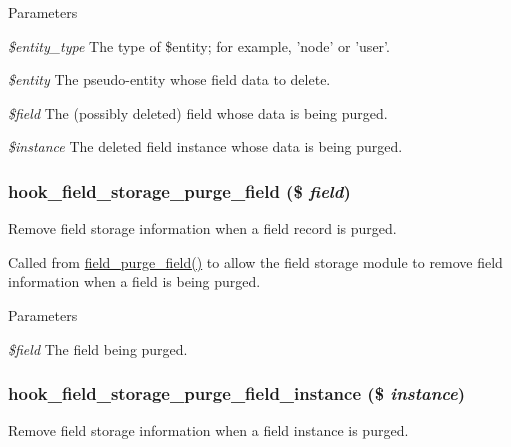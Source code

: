 \begin{DoxyParams}{Parameters}
\item[{\em \$entity\_\-type}]The type of \$entity; for example, 'node' or 'user'. \item[{\em \$entity}]The pseudo-\/entity whose field data to delete. \item[{\em \$field}]The (possibly deleted) field whose data is being purged. \item[{\em \$instance}]The deleted field instance whose data is being purged. \end{DoxyParams}
\hypertarget{group__field__crud_gaf58b7071fdeee08fb4edadc127eecd5d}{
\subsubsection[{hook\_\-field\_\-storage\_\-purge\_\-field}]{\setlength{\rightskip}{0pt plus 5cm}hook\_\-field\_\-storage\_\-purge\_\-field (\$ {\em field})}}
\label{group__field__crud_gaf58b7071fdeee08fb4edadc127eecd5d}
Remove field storage information when a field record is purged.

Called from \hyperlink{group__field__purge_gac52122a65da997921f3a6a8f45deddbf}{field\_\-purge\_\-field()} to allow the field storage module to remove field information when a field is being purged.


\begin{DoxyParams}{Parameters}
\item[{\em \$field}]The field being purged. \end{DoxyParams}
\hypertarget{group__field__crud_ga9634594ee1edc36db59d2e87abfaf193}{
\subsubsection[{hook\_\-field\_\-storage\_\-purge\_\-field\_\-instance}]{\setlength{\rightskip}{0pt plus 5cm}hook\_\-field\_\-storage\_\-purge\_\-field\_\-instance (\$ {\em instance})}}
\label{group__field__crud_ga9634594ee1edc36db59d2e87abfaf193}
Remove field storage information when a field instance is purged.

